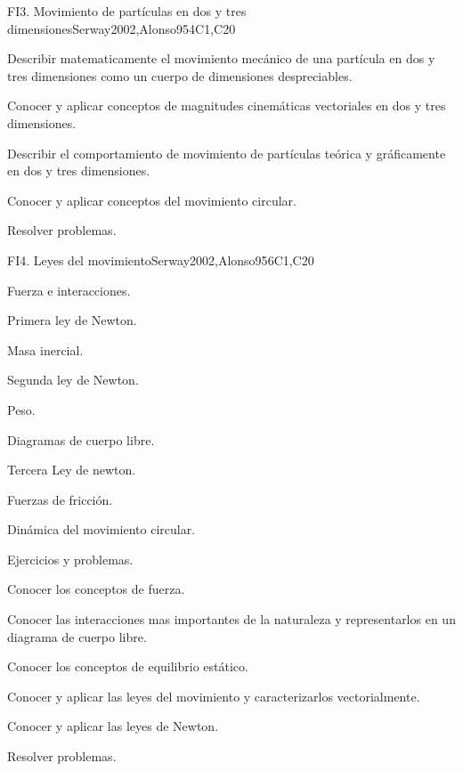\begin{syllabus}
\begin{unit}{FI3. Movimiento de partículas en dos y tres dimensiones}{}{Serway2002,Alonso95}{4}{C1,C20}
   \begin{learningoutcomes}
      \item Describir matematicamente el movimiento mecánico de una partícula en dos y tres dimensiones como un cuerpo de dimensiones despreciables.
      \item Conocer y aplicar conceptos de magnitudes cinemáticas vectoriales en dos y tres dimensiones.
      \item Describir el comportamiento de movimiento de partículas teórica y gráficamente en dos y tres dimensiones.
      \item Conocer y aplicar conceptos del movimiento circular.
      \item Resolver problemas.
   \end{learningoutcomes}
\end{unit}

\begin{unit}{FI4. Leyes del movimiento}{}{Serway2002,Alonso95}{6}{C1,C20}
\begin{topics}
      \item Fuerza e interacciones.
      \item Primera ley de Newton.
      \item Masa inercial.
      \item Segunda ley de Newton.
      \item Peso.
      \item Diagramas de cuerpo libre.
      \item Tercera Ley de newton.
      \item Fuerzas de fricción.
      \item Dinámica del movimiento circular.
      \item Ejercicios y problemas.
   \end{topics}

   \begin{learningoutcomes}
      \item Conocer los conceptos de fuerza.
      \item Conocer las interacciones mas importantes de la naturaleza y representarlos en un diagrama de cuerpo libre.
      \item Conocer los conceptos de equilibrio estático.
      \item Conocer y aplicar las leyes del movimiento y caracterizarlos vectorialmente.
      \item Conocer y aplicar las leyes de Newton.
      \item Resolver problemas.
   \end{learningoutcomes}
\end{unit}


\end{syllabus}

